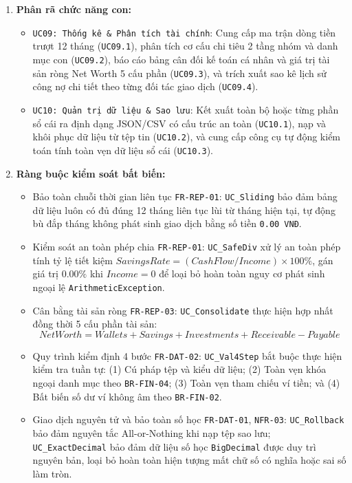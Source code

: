 \documentclass[11pt,a4paper]{article}
\providecommand{\tightlist}{
  \setlength{\itemsep}{0pt}\setlength{\parskip}{0pt}}
\begin{document}
\begin{enumerate}
\def\labelenumi{\arabic{enumi}.}
\item
  \textbf{Phân rã chức năng con:}

  \begin{itemize}
  \tightlist
  \item
    \texttt{UC09:\ Thống\ kê\ \&\ Phân\ tích\ tài\ chính}: Cung cấp ma
    trận dòng tiền trượt 12 tháng (\texttt{UC09.1}), phân tích cơ cấu
    chi tiêu 2 tầng nhóm và danh mục con (\texttt{UC09.2}), báo cáo bảng
    cân đối kế toán cá nhân và giá trị tài sản ròng Net Worth 5 cấu phần
    (\texttt{UC09.3}), và trích xuất sao kê lịch sử công nợ chi tiết
    theo từng đối tác giao dịch (\texttt{UC09.4}).
  \item
    \texttt{UC10:\ Quản\ trị\ dữ\ liệu\ \&\ Sao\ lưu}: Kết xuất toàn bộ
    hoặc từng phần sổ cái ra định dạng JSON/CSV có cấu trúc an toàn
    (\texttt{UC10.1}), nạp và khôi phục dữ liệu từ tệp tin
    (\texttt{UC10.2}), và cung cấp công cụ tự động kiểm toán tính toàn
    vẹn dữ liệu sổ cái (\texttt{UC10.3}).
  \end{itemize}
\item
  \textbf{Ràng buộc kiểm soát bất biến:}

  \begin{itemize}
  \tightlist
  \item
    Bảo toàn chuỗi thời gian liên tục \texttt{FR-REP-01}:
    \texttt{UC\_Sliding} bảo đảm bảng dữ liệu luôn có đủ đúng 12 tháng
    liên tục lùi từ tháng hiện tại, tự động bù đắp tháng không phát sinh
    giao dịch bằng số tiền \texttt{0.00\ VNĐ}.
  \item
    Kiểm soát an toàn phép chia \texttt{FR-REP-01}: \texttt{UC\_SafeDiv}
    xử lý an toàn phép tính tỷ lệ tiết kiệm
    \(SavingsRate = (CashFlow / Income) \times 100\%\), gán giá trị
    \(0.00\%\) khi \(Income = 0\) để loại bỏ hoàn toàn nguy cơ phát sinh
    ngoại lệ \texttt{ArithmeticException}.
  \item
    Cân bằng tài sản ròng \texttt{FR-REP-03}: \texttt{UC\_Consolidate}
    thực hiện hợp nhất đồng thời 5 cấu phần tài sản:
    \[NetWorth = Wallets + Savings + Investments + Receivable - Payable\]
  \item
    Quy trình kiểm định 4 bước \texttt{FR-DAT-02}: \texttt{UC\_Val4Step}
    bắt buộc thực hiện kiểm tra tuần tự: (1) Cú pháp tệp và kiểu dữ
    liệu; (2) Toàn vẹn khóa ngoại danh mục theo \texttt{BR-FIN-04}; (3)
    Toàn vẹn tham chiếu ví tiền; và (4) Bất biến số dư ví không âm theo
    \texttt{BR-FIN-02}.
  \item
    Giao dịch nguyên tử và bảo toàn số học \texttt{FR-DAT-01},
    \texttt{NFR-03}: \texttt{UC\_Rollback} bảo đảm nguyên tắc
    All-or-Nothing khi nạp tệp sao lưu; \texttt{UC\_ExactDecimal} bảo
    đảm dữ liệu số học \texttt{BigDecimal} được duy trì nguyên bản, loại
    bỏ hoàn toàn hiện tượng mất chữ số có nghĩa hoặc sai số làm tròn.
  \end{itemize}
\end{enumerate}
\end{document}
